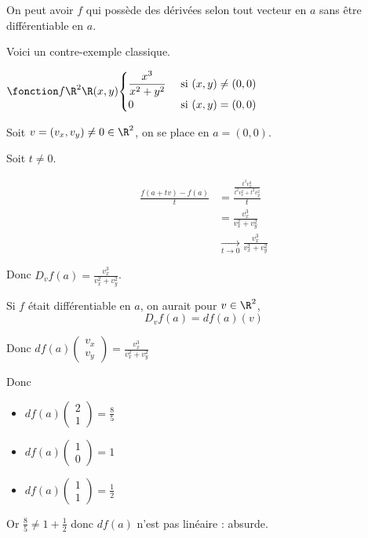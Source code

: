 \begin{proposition}{}{}
    On peut avoir $f$ qui possède des dérivées selon tout vecteur en $a$ sans être 
    différentiable en $a$. 
\end{proposition}

\begin{exemple}
    Voici un contre-exemple classique. 

    $\fonction f {\R^2}{\R}{(x, y)}{\begin{cases}
        \displaystyle \frac{x^3}{x^2 + y^2} & \text{ si } (x, y) \neq (0, 0) \\
        0 & \text{ si } (x, y) = (0, 0)
    \end{cases}}$

    Soit $v = (v_x, v_y) \neq 0 \in \R^2$, on se place en $a = (0, 0)$.

    Soit $t \neq 0$. 

    \begin{align}
        \frac{f(a + tv) - f(a)}{t} & = \frac{\frac{t^3 v_x^3}{t^2 v_x^2 + t^2 v_y^2}}{t } \\
        & = \frac{v_x^3}{v_x^2 + v_y^2} \\
        & \xrightarrow[t \to 0 ]{} \frac{v_x^3}{v_x^2 + v_y^2}
    \end{align}

    Donc $D_vf(a) = \frac{v_x^3}{v_x^2 + v_y^2}$.

    Si $f$ était différentiable en $a$, on aurait pour $v \in \R^2$, 
    $$D_v f(a) = df(a)(v) $$

    Donc $\displaystyle df(a)\begin{pmatrix}
        v_x \\
        v_y
    \end{pmatrix} = \frac{v_x^3}{v_x^2 + v_y^2}$

    Donc 
    
    \begin{itemize}
        \item $\displaystyle df(a) \begin{pmatrix}
        2 \\
        1
    \end{pmatrix} = \frac{8}{5}$
        \item $\displaystyle df(a) \begin{pmatrix}
        1 \\
        0
    \end{pmatrix} = 1$
        \item $\displaystyle df(a) \begin{pmatrix}
        1 \\
        1
    \end{pmatrix} = \frac{1}{2}$
    \end{itemize}

    Or $\frac 8 5 \neq 1 + \frac 1 2$ donc $df(a)$ n'est pas linéaire : absurde. 
\end{exemple}

